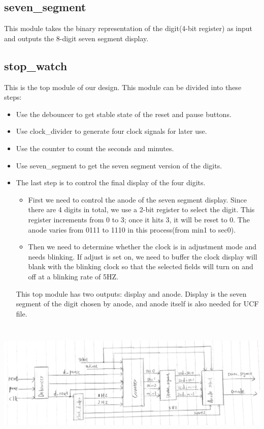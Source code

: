 \documentclass[12pt]{article}
\begin{document}
\subsection*{seven\_segment}
This module takes the binary representation of the digit(4-bit register) as input and outputs the 8-digit seven segment display.

\subsection*{stop\_watch}
This is the top module of our design. This module can be divided into these steps:
\begin{itemize}
\item Use the debouncer to get stable state of the reset and pause buttons.
\item Use clock\_divider to generate four clock signals for later use.
\item Use the counter to count the seconds and minutes.
\item Use seven\_segment to get the seven segment version of the digits. 
\item The last step is to control the final display of the four digits.
\begin{itemize}
\item First we need to control the anode of the seven segment display. Since there are 4 digits in total, we use a 2-bit register to select the digit. This register increments from 0 to 3; once it hits 3, it will be reset to 0. The anode varies from 0111 to 1110 in this process(from min1 to sec0).
\item Then we need to determine whether the clock is in adjustment mode and needs blinking. If adjust is set on, we need to buffer the clock display will blank with the blinking clock so that the selected fields will turn on and off at a blinking rate of 5HZ.
\end{itemize} 
This top module has two outputs: display and anode. Display is the seven segment of the digit chosen by anode, and anode itself is also needed for UCF file. 



\end{itemize} 

\begin{minipage}{\linewidth}
            \centering
            \includegraphics[width=15cm, height=5.9cm]{diagram.png}
            \label{fig:figure1}
        \end{minipage} 
\end{document}
